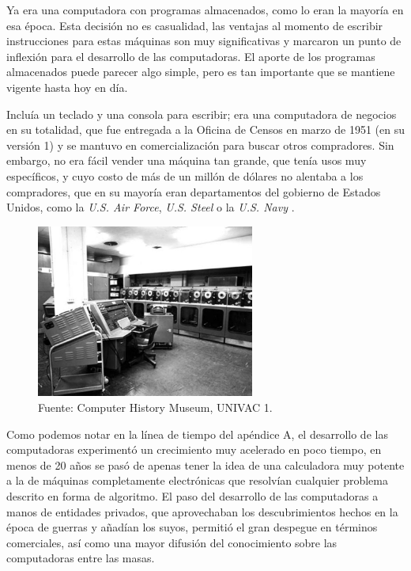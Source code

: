 \documentclass[letterpaper,12pt,oneside]{book}
\begin{document}
		Ya era una computadora con programas almacenados, como lo eran la mayoría en esa época. Esta decisión no es casualidad, las
		ventajas al momento de escribir instrucciones para estas máquinas son muy significativas y marcaron un punto de inflexión para el desarrollo de las computadoras.
		El aporte de los programas almacenados puede parecer algo simple, pero es tan importante  que se mantiene vigente hasta hoy en día.
  
        Incluía un teclado y una 
		consola para escribir; era una computadora de negocios en su totalidad, que
		fue entregada a la Oficina de Censos en marzo de 1951 (en su versión 1) y se mantuvo en comercialización para buscar otros compradores. Sin embargo, no era  fácil 
		vender una máquina
		tan grande, que tenía usos muy específicos, y cuyo costo de más de un millón de dólares no alentaba a los compradores, que en su mayoría
		eran departamentos del gobierno de Estados Unidos, como la \textit{U.S. Air Force}, \textit{U.S. Steel} o la \textit{U.S. Navy} \cite[p.43]{oregan_brief_2012}.
		
		
		\begin{figure}
		    \centering
		    \includegraphics[width=0.64\textwidth]{media/Historia/CHM_computers_1951.univacI.jpg}
		    \caption{Fuente: Computer History Museum, UNIVAC 1.}
	    	\label{fig:univac1}
		\end{figure}
		
		

		
		Como podemos notar en la línea de tiempo del apéndice A, el desarrollo de las computadoras experimentó un crecimiento muy acelerado en poco tiempo, en menos de 20 años se pasó de apenas tener la idea
		de una calculadora muy potente a la de máquinas completamente electrónicas que resolvían cualquier problema
		descrito en forma de algoritmo. El paso del desarrollo de las computadoras a manos de entidades privados, que aprovechaban los
descubrimientos hechos en la época de guerras y añadían los suyos, permitió
el gran despegue en términos comerciales, así como una mayor difusión del conocimiento sobre las computadoras entre las masas.
  
\end{document}
